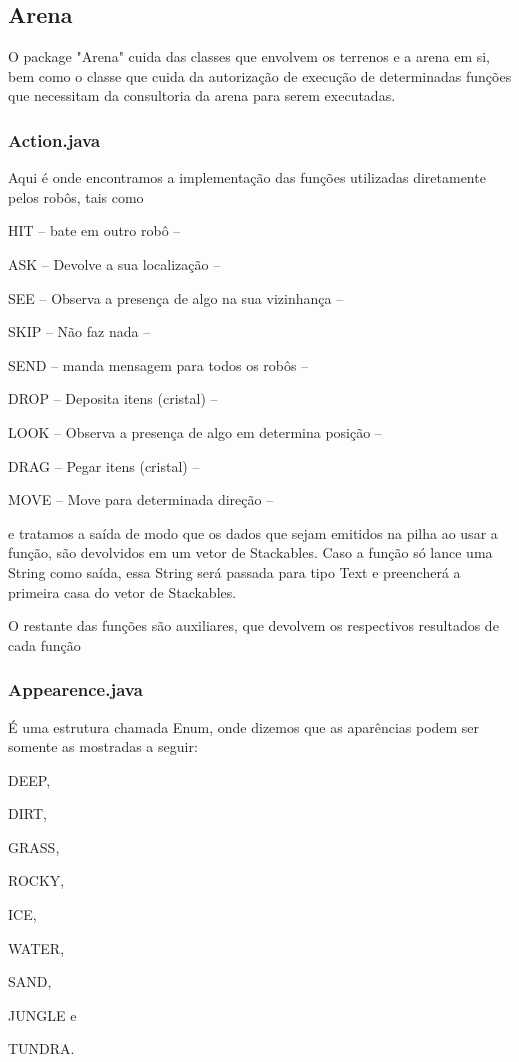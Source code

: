 \documentclass[a4paper]{article}
\begin{document}
	\subsection{Arena}
		O package "Arena" cuida das classes que envolvem os
		terrenos e a arena em si, bem como o classe que cuida
		da autorização de execução de determinadas funções que
		necessitam da consultoria da arena para serem executadas.
		
		\subsubsection{ Action.java }
		    Aqui é onde encontramos a implementação das funções
		    utilizadas diretamente pelos robôs, tais como 
		    
		    {\textcolor{NavyBlue}{HIT} 
		    -- bate em outro robô -- 
		   
		    {\textcolor{NavyBlue}{ASK}
		    -- Devolve a sua localização --
		   
		    {\textcolor{NavyBlue}{SEE}
		    -- Observa a presença de algo na sua vizinhança --
		    
		    {\textcolor{NavyBlue}{SKIP}
		    -- Não faz nada --
		    		    
		    {\textcolor{NavyBlue}{SEND} 
		    -- manda mensagem para todos os robôs --
		    
		    {\textcolor{NavyBlue}{DROP}
		    -- Deposita itens (cristal) --
		    
		    {\textcolor{NavyBlue}{LOOK}
		    -- Observa a presença de algo em determina posição --
		    		    		    
		    {\textcolor{NavyBlue}{DRAG}
		    -- Pegar itens (cristal) --
		    
		    {\textcolor{NavyBlue}{MOVE}
		    -- Move para determinada direção --

		    \bigskip
		    
		    e tratamos a saída de modo que os dados que sejam 
		    emitidos na pilha ao usar a função, são devolvidos em
		    um vetor de Stackables. 
		    Caso a função só lance uma String como saída, essa 
		    String será passada para tipo Text e preencherá a 
		    primeira casa do vetor de Stackables.
		    
		    O restante das funções são auxiliares, que devolvem
		    os respectivos resultados de cada função
		    
		\subsubsection{ Appearence.java }
		    É uma estrutura chamada Enum, onde dizemos que as
		    aparências podem ser somente as mostradas a seguir:
		    {\textcolor{NavyBlue}{DEEP},
		    {\textcolor{NavyBlue}{DIRT},
            {\textcolor{NavyBlue}{GRASS},
            {\textcolor{NavyBlue}{ROCKY},
            {\textcolor{NavyBlue}{ICE},
            {\textcolor{NavyBlue}{WATER},
            {\textcolor{NavyBlue}{SAND},
            {\textcolor{NavyBlue}{JUNGLE} e
            {\textcolor{NavyBlue}{TUNDRA}.
		
}}}}}}}}}}}}}}}}}}
\end{document}
